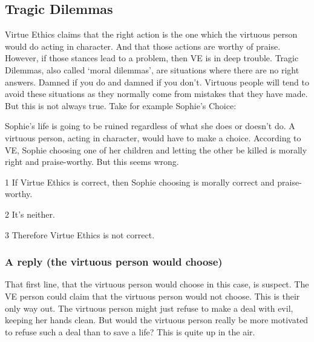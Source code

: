 \subsection{Tragic Dilemmas}

Virtue Ethics claims that the right action is the one which the virtuous person would do acting in character. And that those actions are worthy of praise. However, if those stances lead to a problem, then VE is in deep trouble. Tragic Dilemmas, also called ‘moral dilemmas’, are situations where there are no right answers. Damned if you do and damned if you don’t. Virtuous people will tend to avoid these situations as they normally come from mistakes that they have made. But this is not always true. Take for example Sophie’s Choice:


Sophie’s life is going to be ruined regardless of what she does or doesn’t do. A virtuous person, acting in character, would have to make a choice. According to VE, Sophie choosing one of her children and letting the other be killed is morally right and praise-worthy. But this seems wrong.
\begin{earg}
    \item[1] If Virtue Ethics is correct, then Sophie choosing is morally correct and praise-worthy.
    \item[2] It’s neither.
    \item[3] Therefore Virtue Ethics is not correct.
\end{earg}
\subsubsection{A reply (the virtuous person would choose)}

That first line, that the virtuous person would choose in this case, is suspect. The VE person could claim that the virtuous person would not choose. This is their only way out. The virtuous person might just refuse to make a deal with evil, keeping her hands clean. But would the virtuous person really be more motivated to refuse such a deal than to save a life? This is quite up in the air.
